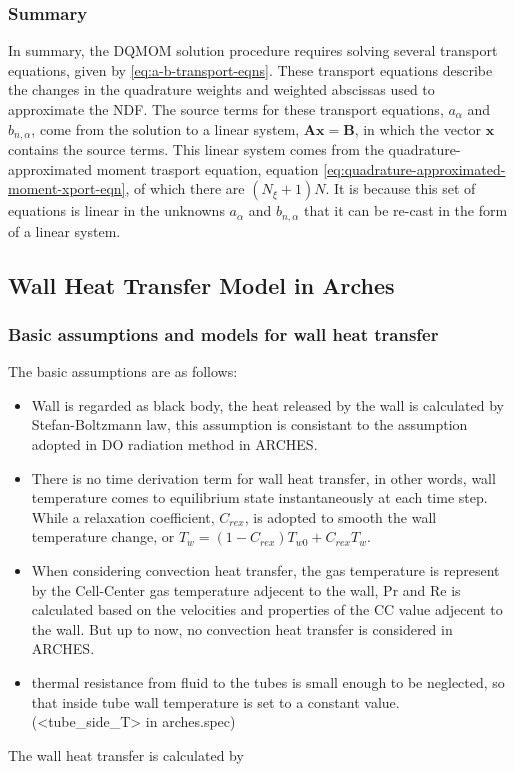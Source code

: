 \subsubsection{Summary}\label{subsubsec:summary}
In summary, the DQMOM solution procedure requires solving several transport equations, given by \ref{eq:a-b-transport-eqns}. These transport equations describe the changes in the quadrature weights and weighted abscissas used to approximate the NDF.  The source terms for these transport equations, $a_{\alpha}$ and $b_{n,\alpha}$, come from the solution to a linear system, $\mathbf{Ax}=\mathbf{B}$, in which the vector $\mathbf{x}$ contains the source terms.  This linear system comes from the quadrature-approximated moment trasport equation, equation \ref{eq:quadrature-approximated-moment-xport-eqn}, of which there are $\left(N_{\xi} + 1\right)N$.  It is because this set of equations is linear in the unknowns $a_{\alpha}$ and $b_{n,\alpha}$ that it can be re-cast in the form of a linear system.

\subsection{Wall Heat Transfer Model in Arches} \label{subsec:WHT}
\subsubsection{Basic assumptions and models for wall heat transfer}

The basic assumptions are as follows:
\begin{itemize}
\item Wall is regarded as black body, the heat released by the wall is calculated
by Stefan-Boltzmann law, this assumption is consistant to the assumption
adopted in DO radiation method in ARCHES.
\item There is no time derivation term for wall heat transfer, in other
words, wall temperature comes to equilibrium state instantaneously
at each time step. While a relaxation coefficient, $C_{rex}$, is
adopted to smooth the wall temperature change, or $T_w=(1-C_{rex})T_{w0}+C_{rex}T_w$.
\item When considering convection heat transfer, the gas temperature is
represent by the Cell-Center gas temperature adjecent to the wall,
Pr and Re is calculated based on the velocities and properties of
the CC value adjecent to the wall. But up to now, no convection heat
transfer is considered in ARCHES.
\item thermal resistance from fluid to the tubes is small enough to be neglected,
so that inside tube wall temperature is set to a constant value. (<tube\_side\_T>
in arches.spec)
\end{itemize}
The wall heat transfer is calculated by

